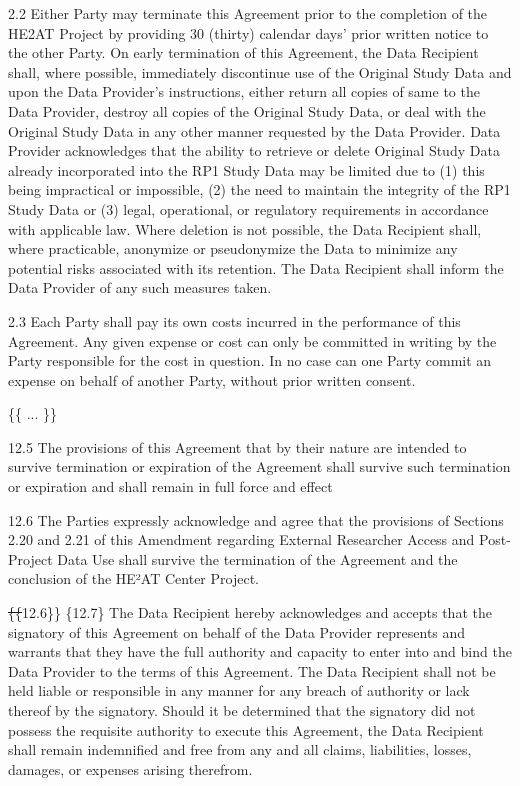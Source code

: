 \documentclass[12pt,letterpaper]{article}
\newcommand{\deleted}[1]{\textcolor{deletecolor}{\sout{#1}}}
\newcommand{\added}[1]{\textcolor{addcolor}{#1}}
\begin{document}
2.2	Either Party may terminate this Agreement prior to the completion of the HE2AT Project by providing 30 (thirty) calendar days’ prior written notice to the other Party. On early termination of this Agreement, the Data Recipient shall, where possible, immediately discontinue use of the Original Study Data and upon the Data Provider’s instructions, either return all copies of same to the Data Provider, destroy all copies of the Original Study Data, or deal with the Original Study Data in any other manner requested by the Data Provider. Data Provider acknowledges that the ability to retrieve or delete Original Study Data already incorporated into the RP1 Study Data may be limited due to (1) this being impractical or impossible, (2) the need to maintain the integrity of the RP1 Study Data or (3) legal, operational, or regulatory requirements in accordance with applicable law. Where deletion is not possible, the Data Recipient shall, where practicable, anonymize or pseudonymize the Data to minimize any potential risks associated with its retention. The Data Recipient shall inform the Data Provider of any such measures taken.

2.3	Each Party shall pay its own costs incurred in the performance of this Agreement. Any given expense or cost can only be committed in writing by the Party responsible for the cost in question. In no case can one Party commit an expense on behalf of another Party, without prior written consent.

\{\{ ... \}\}

12.5 	The provisions of this Agreement that by their nature are intended to survive termination or expiration of the Agreement shall survive such termination or expiration and shall remain in full force and effect

12.6 The Parties expressly acknowledge and agree that the provisions of Sections 2.20 and 2.21 of this Amendment regarding External Researcher Access and Post-Project Data Use shall survive the termination of the Agreement and the conclusion of the HE²AT Center Project.

\deleted\{\deleted\{12.6\}\} \added\{12.7\}	The Data Recipient hereby acknowledges and accepts that the signatory of this Agreement on behalf of the Data Provider represents and warrants that they have the full authority and capacity to enter into and bind the Data Provider to the terms of this Agreement. The Data Recipient shall not be held liable or responsible in any manner for any breach of authority or lack thereof by the signatory. Should it be determined that the signatory did not possess the requisite authority to execute this Agreement, the Data Recipient shall remain indemnified and free from any and all claims, liabilities, losses, damages, or expenses arising therefrom.
\end{document}
